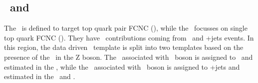 \subsection{\TTSR\ and \STSR}
The \TTSR\ is defined to target top quark pair FCNC (\tZq), while the \STSR\ focusses on single top quark FCNC (\tZ). They have \NPL\ contributions coming from \DY\ and \ttbar+jets events. In this region, the data driven \NPL\ template is split into two templates based on the presence of the \NPL\ in the Z boson. The \NPL\ associated with \PW\ boson is assigned to \DY\ and estimated in the \WZCR, while  the \NPL\ associated with \PZ\ boson is assigned to \ttbar+jets and estimated in the \TTCR\ and \STCR.




